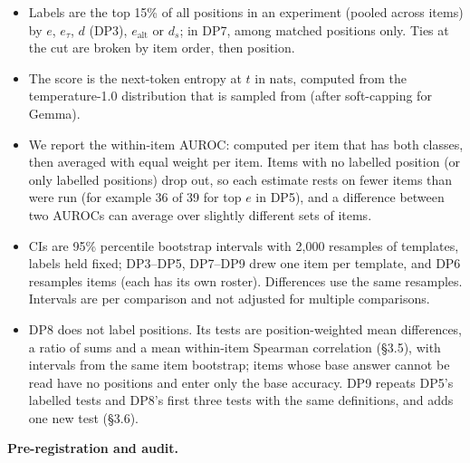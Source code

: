 \documentclass[
  10pt,
  a4paper,
]{article}
\providecommand{\tightlist}{%
  \setlength{\itemsep}{0pt}\setlength{\parskip}{0pt}}
\begin{document}
\begin{itemize}
\tightlist
\item
  Labels are the top 15\% of all positions in an experiment (pooled across items) by \(e\), \(e_{\tau}\), \(d\) (DP3), \(e_{\mathrm{alt}}\) or \(d_{s}\); in DP7, among matched positions only. Ties at
  the cut are broken by item order, then position.
\item
  The score is the next-token entropy at \(t\) in nats, computed from the temperature-1.0 distribution that is sampled from (after soft-capping for Gemma).
\item
  We report the within-item AUROC: computed per item that has both classes, then averaged with equal weight per item. Items with no labelled position (or only labelled positions) drop out, so each
  estimate rests on fewer items than were run (for example 36 of 39 for top \(e\) in DP5), and a difference between two AUROCs can average over slightly different sets of items.
\item
  CIs are 95\% percentile bootstrap intervals with 2,000 resamples of templates, labels held fixed; DP3--DP5, DP7--DP9 drew one item per template, and DP6 resamples items (each has its own roster).
  Differences use the same resamples. Intervals are per comparison and not adjusted for multiple comparisons.
\item
  DP8 does not label positions. Its tests are position-weighted mean differences, a ratio of sums and a mean within-item Spearman correlation (§3.5), with intervals from the same item bootstrap; items
  whose base answer cannot be read have no positions and enter only the base accuracy. DP9 repeats DP5's labelled tests and DP8's first three tests with the same definitions, and adds one new test
  (§3.6).
\end{itemize}

\textbf{Pre-registration and audit.}
\end{document}
